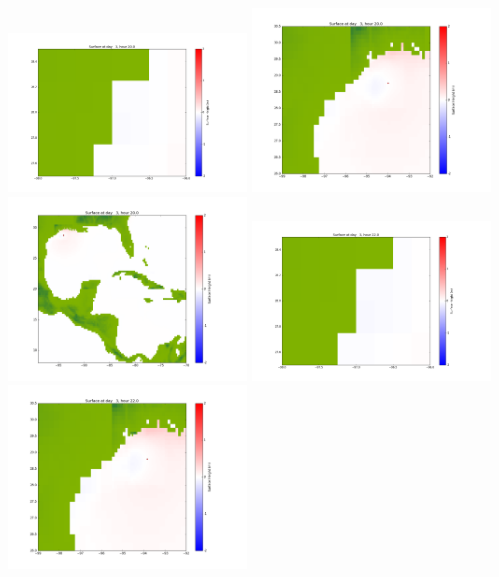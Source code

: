 \documentclass[11pt]{article}
\begin{document}
\vskip 10pt 
\includegraphics[width=0.475\textwidth]{frame0070fig1001.png}
\includegraphics[width=0.475\textwidth]{frame0070fig1002.png}
\vskip 10pt 
\includegraphics[width=0.475\textwidth]{frame0070fig1003.png}
\vskip 10pt 
\includegraphics[width=0.475\textwidth]{frame0071fig1001.png}
\includegraphics[width=0.475\textwidth]{frame0071fig1002.png}
\end{document}
